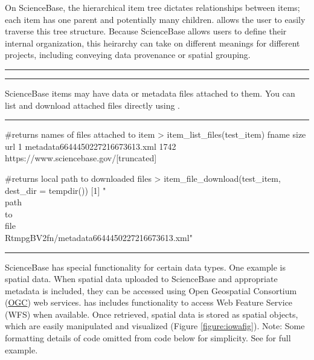 On ScienceBase, the hierarchical item tree dictates relationships between items; 
each item has one parent and potentially many children.  allows the user to
easily traverse this tree structure. Because ScienceBase allows users to define their internal 
organization, this heirarchy can take on different meanings for different projects, including 
conveying data provenance or spatial grouping.


\noindent\rule{\textwidth}{0.4pt}
\noindent\rule{\textwidth}{0.4pt}

ScienceBase items may have data or metadata files attached to them.
You can list and download attached files directly using .

\noindent\rule{\textwidth}{0.4pt}
\begin{example}
#returns names of files attached to item
> item_list_files(test_item)
                              fname size  url
  1 metadata6644450227216673613.xml 1742  https://www.sciencebase.gov/[truncated]

#returns local path to downloaded files
> item_file_download(test_item, dest_dir = tempdir())
[1] "\\path\\to\\file\\RtmpgBV2fn/metadata6644450227216673613.xml"
\end{example}
\noindent\rule{\textwidth}{0.4pt}

ScienceBase has special functionality for certain data types.
One example is spatial data. When spatial data uploaded to ScienceBase 
and appropriate metadata is included, they can be accessed using 
Open Geospatial Consortium (\href{http://www.opengeospatial.org/}{OGC}) 
web services.  has includes functionality to access Web
Feature Service (WFS) when available. Once retrieved, spatial data is stored 
as  spatial objects, which are easily manipulated and visualized (Figure \ref{figure:iowafig}). 
Note: Some formatting details of code
omitted from code below for simplicity. See  
for full example.

